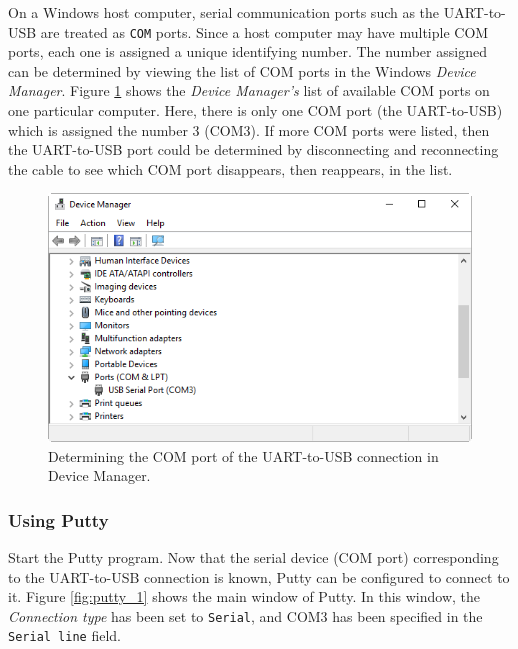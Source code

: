 \documentclass[11pt, twoside, pdftex]{article}
\begin{document}
On a Windows host computer, serial communication ports such as the UART-to-USB 
are treated as \texttt{COM} ports. Since a host computer may have multiple COM ports, 
each one is assigned a unique identifying number. The number assigned can be 
determined by viewing the list of COM ports in the Windows
\textit{Device Manager}. Figure \ref{fig:putty_0} shows the \textit{Device Manager's} list of 
available COM ports on one particular computer. Here, there is only one COM port (the UART-to-USB)
which is assigned the number 3 (COM3). If more COM ports were listed, then the UART-to-USB
port could be determined by disconnecting and reconnecting the cable to see which COM port 
disappears, then reappears, in the list.

\begin{figure}[H]
   \begin{center}
       \includegraphics[scale=0.7]{figures/fig_putty_tut_0}
   \end{center}
   \caption{Determining the COM port of the UART-to-USB connection in Device Manager.}
	\label{fig:putty_0}
\end{figure}

\subsubsection{Using Putty}

Start the Putty program. Now that the serial device (COM port) corresponding to the 
UART-to-USB connection is known, Putty can be configured to connect to it. 
Figure \ref{fig:putty_1} shows the
main window of Putty. In this window, the {\it Connection type} has been set to
\texttt{Serial}, and 
COM3 has been specified in the \texttt{Serial line} field. 
\end{document}
